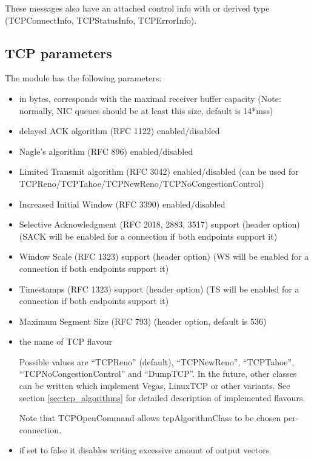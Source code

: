 These messages also have an attached control info with 
or derived type (TCPConnectInfo, TCPStatusInfo, TCPErrorInfo).


\subsection{TCP parameters}

The  module has the following parameters:
\begin{itemize}
  \item {} in bytes, corresponds with the maximal receiver buffer capacity (Note: normally, NIC queues should be at least this size, default is  14*mss)
  \item {} delayed ACK algorithm (RFC 1122) enabled/disabled
  \item {} Nagle's algorithm (RFC 896) enabled/disabled
  \item {} Limited Transmit algorithm (RFC 3042) enabled/disabled (can be used for TCPReno/TCPTahoe/TCPNewReno/TCPNoCongestionControl)
  \item {} Increased Initial Window (RFC 3390) enabled/disabled
  \item {} Selective Acknowledgment (RFC 2018, 2883, 3517) support (header option) (SACK will be enabled for a connection if both endpoints support it)
  \item {} Window Scale (RFC 1323) support (header option) (WS will be enabled for a connection if both endpoints support it)
  \item {} Timestamps (RFC 1323) support (header option) (TS will be enabled for a connection if both endpoints support it)
  \item {} Maximum Segment Size (RFC 793) (header option, default is 536)
  \item {} the name of TCP flavour

             Possible values are ``TCPReno'' (default), ``TCPNewReno'', ``TCPTahoe'', ``TCPNoCongestionControl'' and ``DumpTCP''.
             In the future, other classes can be written which implement Vegas, LinuxTCP  or other variants.
             See section \ref{sec:tcp_algorithms} for detailed description of implemented flavours.

             Note that TCPOpenCommand allows tcpAlgorithmClass to be chosen per-connection.

  \item {} if set to false it disables writing excessive amount of output vectors
\end{itemize}

